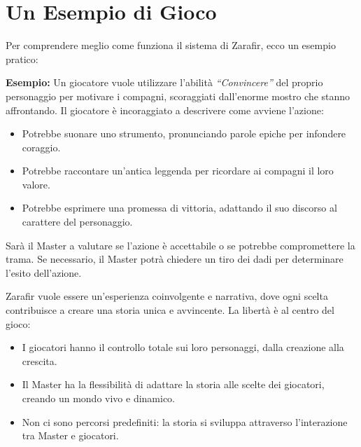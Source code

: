 \documentclass[../manuale_main.tex]{subfiles}
\begin{document}
\vspace{0.3cm}

\section*{Un Esempio di Gioco}
Per comprendere meglio come funziona il sistema di Zarafir, ecco un esempio pratico:

\vspace{0.2cm}

\textbf{Esempio:} Un giocatore vuole utilizzare l'abilità \textit{“Convincere”} del proprio personaggio per motivare i compagni, scoraggiati dall’enorme mostro che stanno affrontando. Il giocatore è incoraggiato a descrivere come avviene l'azione:

\begin{itemize}
\item Potrebbe suonare uno strumento, pronunciando parole epiche per infondere coraggio.
\item Potrebbe raccontare un'antica leggenda per ricordare ai compagni il loro valore.
\item Potrebbe esprimere una promessa di vittoria, adattando il suo discorso al carattere del personaggio.
\end{itemize}

Sarà il Master a valutare se l'azione è accettabile o se potrebbe compromettere la trama. Se necessario, il Master potrà chiedere un tiro dei dadi per determinare l'esito dell'azione. 

Zarafir vuole essere un’esperienza coinvolgente e narrativa, dove ogni scelta contribuisce a creare una storia unica e avvincente. La libertà è al centro del gioco:

\begin{itemize}
\item I giocatori hanno il controllo totale sui loro personaggi, dalla creazione alla crescita.
\item Il Master ha la flessibilità di adattare la storia alle scelte dei giocatori, creando un mondo vivo e dinamico.
\item Non ci sono percorsi predefiniti: la storia si sviluppa attraverso l'interazione tra Master e giocatori.
\end{itemize}
\end{document}
